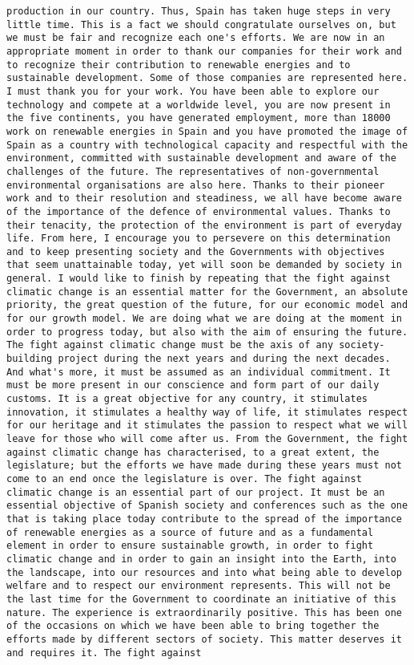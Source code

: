 \documentclass[
]{article}
\begin{document}
\begin{verbatim}
production in our country. Thus, Spain has taken huge steps in very little time. This is a fact we should congratulate ourselves on, but we must be fair and recognize each one's efforts. We are now in an appropriate moment in order to thank our companies for their work and to recognize their contribution to renewable energies and to sustainable development. Some of those companies are represented here. I must thank you for your work. You have been able to explore our technology and compete at a worldwide level, you are now present in the five continents, you have generated employment, more than 18000 work on renewable energies in Spain and you have promoted the image of Spain as a country with technological capacity and respectful with the environment, committed with sustainable development and aware of the challenges of the future. The representatives of non-governmental environmental organisations are also here. Thanks to their pioneer work and to their resolution and steadiness, we all have become aware of the importance of the defence of environmental values. Thanks to their tenacity, the protection of the environment is part of everyday life. From here, I encourage you to persevere on this determination and to keep presenting society and the Governments with objectives that seem unattainable today, yet will soon be demanded by society in general. I would like to finish by repeating that the fight against climatic change is an essential matter for the Government, an absolute priority, the great question of the future, for our economic model and for our growth model. We are doing what we are doing at the moment in order to progress today, but also with the aim of ensuring the future. The fight against climatic change must be the axis of any society-building project during the next years and during the next decades. And what's more, it must be assumed as an individual commitment. It must be more present in our conscience and form part of our daily customs. It is a great objective for any country, it stimulates innovation, it stimulates a healthy way of life, it stimulates respect for our heritage and it stimulates the passion to respect what we will leave for those who will come after us. From the Government, the fight against climatic change has characterised, to a great extent, the legislature; but the efforts we have made during these years must not come to an end once the legislature is over. The fight against climatic change is an essential part of our project. It must be an essential objective of Spanish society and conferences such as the one that is taking place today contribute to the spread of the importance of renewable energies as a source of future and as a fundamental element in order to ensure sustainable growth, in order to fight climatic change and in order to gain an insight into the Earth, into the landscape, into our resources and into what being able to develop welfare and to respect our environment represents. This will not be the last time for the Government to coordinate an initiative of this nature. The experience is extraordinarily positive. This has been one of the occasions on which we have been able to bring together the efforts made by different sectors of society. This matter deserves it and requires it. The fight against 
\end{verbatim}
\end{document}
